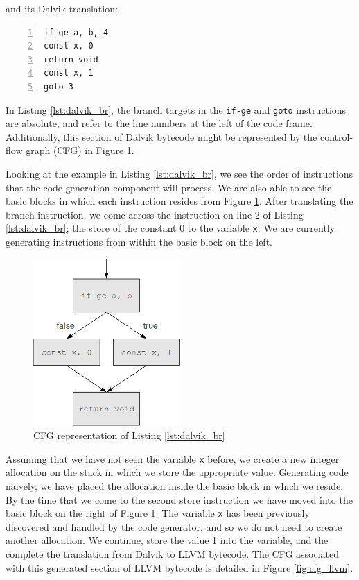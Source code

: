 and its Dalvik translation:

\lstset{
	language=Assembly,
	basicstyle=\small,
	stringstyle=\ttfamily
}

\begin{lstlisting}[frame=single, numbers=left, numberstyle=\tiny, caption={Dalvik code for Listing \ref{lst:java_br}}, label=lst:dalvik_br]
if-ge a, b, 4
const x, 0
return void
const x, 1
goto 3
\end{lstlisting}

In Listing \ref{lst:dalvik_br}, the branch targets in the \verb|if-ge| and \verb|goto| instructions are absolute, and refer to the line numbers at the left of the code frame. Additionally, this section of Dalvik bytecode might be represented by the control-flow graph (CFG) in Figure \ref{fig:cfg_dalvik}.

Looking at the example in Listing \ref{lst:dalvik_br}, we see the order of instructions that the code generation component will process. We are also able to see the basic blocks in which each instruction resides from Figure \ref{fig:cfg_dalvik}. After translating the branch instruction, we come across the instruction on line 2 of Listing \ref{lst:dalvik_br}; the store of the constant 0 to the variable \verb|x|. We are currently generating instructions from within the basic block on the left.

\begin{figure}[h!]
    \centering
    \includegraphics[width=0.5\textwidth]{images/cfg_dalvik.png}
    \caption{CFG representation of Listing \ref{lst:dalvik_br}}
    \label{fig:cfg_dalvik}
\end{figure}

Assuming that we have not seen the variable \verb|x| before, we create a new integer allocation on the stack in which we store the appropriate value. Generating code na\"{\i}vely, we have placed the allocation inside the basic block in which we reside. By the time that we come to the second store instruction we have moved into the basic block on the right of Figure \ref{fig:cfg_dalvik}. The variable \verb|x| has been previously discovered and handled by the code generator, and so we do not need to create another allocation. We continue, store the value 1 into the variable, and the complete the translation from Dalvik to LLVM bytecode. The CFG associated with this generated section of LLVM bytecode is detailed in Figure \ref{fig:cfg_llvm}.

